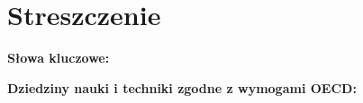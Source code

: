 \section*{Streszczenie}

\vspace{1cm}
\noindent
\textbf{Słowa kluczowe:}

\vspace{1cm}
\noindent
\textbf{Dziedziny nauki i techniki zgodne z wymogami OECD:}
